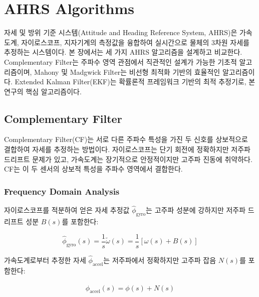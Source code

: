 \section{AHRS Algorithms}

자세 및 방위 기준 시스템(Attitude and Heading Reference System, AHRS)은
가속도계, 자이로스코프, 지자기계의 측정값을 융합하여
실시간으로 물체의 3차원 자세를 추정하는 시스템이다.
본 장에서는 세 가지 AHRS 알고리즘을 설계하고 비교한다.
Complementary Filter는 주파수 영역 관점에서 직관적인 설계가 가능한 기초적 알고리즘이며,
Mahony 및 Madgwick Filter는 비선형 최적화 기반의 효율적인 알고리즘이다.
Extended Kalman Filter(EKF)는 확률론적 프레임워크 기반의 최적 추정기로,
본 연구의 핵심 알고리즘이다.

\subsection{Complementary Filter}

Complementary Filter(CF)는 서로 다른 주파수 특성을 가진 두 신호를
상보적으로 결합하여 자세를 추정하는 방법이다.
자이로스코프는 단기 회전에 정확하지만 저주파 드리프트 문제가 있고,
가속도계는 장기적으로 안정적이지만 고주파 진동에 취약하다.
CF는 이 두 센서의 상보적 특성을 주파수 영역에서 결합한다.

\subsubsection{Frequency Domain Analysis}

자이로스코프를 적분하여 얻은 자세 추정값 $\hat{\phi}_{\text{gyro}}$는
고주파 성분에 강하지만 저주파 드리프트 성분 $B(s)$를 포함한다:

\begin{equation}
    \hat{\phi}_{\text{gyro}}(s) = \frac{1}{s}\tilde{\omega}(s) = \frac{1}{s}\left[\omega(s) + B(s)\right]
    \label{eq:cf_gyro_freq}
\end{equation}

가속도계로부터 추정한 자세 $\hat{\phi}_{\text{accel}}$는
저주파에서 정확하지만 고주파 잡음 $N(s)$를 포함한다:

\begin{equation}
    \hat{\phi}_{\text{accel}}(s) = \phi(s) + N(s)
    \label{eq:cf_accel_freq}
\end{equation}

